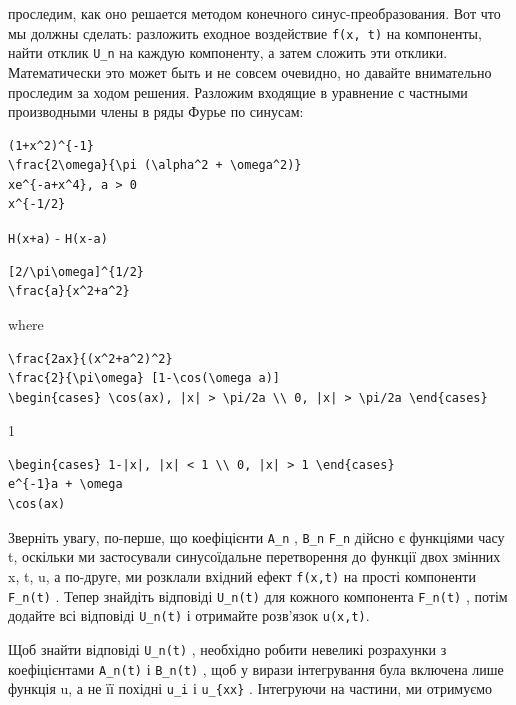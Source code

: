 \documentclass[
  ukrainian,
]{article}
\begin{document}
проследим, как оно решается методом конечного синус-преобразования. Вот
что мы должны сделать: разложить еходное воздействие \texttt{f(x,\ t)}
на компоненты, найти отклик \texttt{U\_n} на каждую компоненту, а затем
сложить эти отклики. Математически это может быть и не совсем очевидно,
но давайте внимательно проследим за ходом решения. Разложим входящие в
уравнение с частными производными члены в ряды Фурье по синусам:

\begin{verbatim}
(1+x^2)^{-1}
\frac{2\omega}{\pi (\alpha^2 + \omega^2)}
xe^{-a+x^4}, a > 0
x^{-1/2}
\end{verbatim}

\texttt{H(x+a)} - \texttt{H(x-a)}

\begin{verbatim}
[2/\pi\omega]^{1/2}
\frac{a}{x^2+a^2}
\end{verbatim}

where

\begin{verbatim}
\frac{2ax}{(x^2+a^2)^2}
\frac{2}{\pi\omega} [1-\cos(\omega a)]
\begin{cases} \cos(ax), |x| > \pi/2a \\ 0, |x| > \pi/2a \end{cases}
\end{verbatim}

1

\begin{verbatim}
\begin{cases} 1-|x|, |x| < 1 \\ 0, |x| > 1 \end{cases}
e^{-1}a + \omega
\cos(ax)
\end{verbatim}

Зверніть увагу, по-перше, що коефіцієнти \texttt{A\_n} , \texttt{B\_n}
\texttt{F\_n} дійсно є функціями часу t, оскільки ми застосували
синусоїдальне перетворення до функції двох змінних x, t, u, а по-друге,
ми розклали вхідний ефект \texttt{f(x,t)} на прості компоненти
\texttt{F\_n(t)} . Тепер знайдіть відповіді \texttt{U\_n(t)} для кожного
компонента \texttt{F\_n(t)} , потім додайте всі відповіді
\texttt{U\_n(t)} і отримайте розв'язок \texttt{u(x,t)}.

Щоб знайти відповіді \texttt{U\_n(t)} , необхідно робити невеликі
розрахунки з коефіцієнтами \texttt{A\_n(t)} і \texttt{B\_n(t)} , щоб у
вирази інтегрування була включена лише функція u, а не її похідні
\texttt{u\_i} і \texttt{u\_\{xx\}} . Інтегруючи на частини, ми отримуємо
\end{document}
